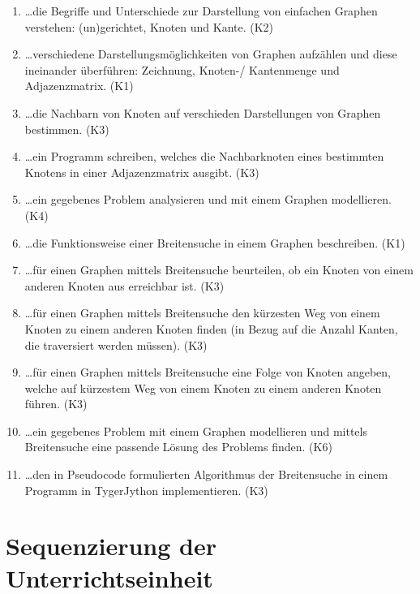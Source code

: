 \begin{enumerate}
\item \dots die Begriffe und Unterschiede zur Darstellung von einfachen Graphen verstehen: (un)gerichtet, Knoten und Kante. (K2)

\item \dots verschiedene Darstellungsmöglichkeiten von Graphen aufzählen und diese ineinander überführen: Zeichnung, Knoten-/ Kantenmenge und Adjazenzmatrix. (K1)

\item \dots die Nachbarn von Knoten auf verschieden Darstellungen von Graphen bestimmen. (K3)

\item \dots ein Programm schreiben, welches die Nachbarknoten eines bestimmten Knotens in einer Adjazenzmatrix ausgibt. (K3)

\item\dots ein gegebenes Problem analysieren und mit einem Graphen modellieren. (K4)
 
\item \dots die Funktionsweise einer Breitensuche in einem Graphen beschreiben. (K1)

\item\dots f\"ur einen Graphen mittels Breitensuche beurteilen, ob ein Knoten von einem anderen Knoten aus erreichbar ist. (K3)

\item\dots f\"ur einen Graphen mittels Breitensuche den k\"urzesten Weg von einem Knoten zu einem anderen Knoten finden (in Bezug auf die Anzahl Kanten, die traversiert werden m\"ussen). (K3)

\item\dots f\"ur einen Graphen mittels Breitensuche eine Folge von Knoten angeben, welche auf k\"urzestem Weg von einem Knoten zu einem anderen Knoten f\"uhren. (K3)

\item \dots ein gegebenes Problem mit einem Graphen modellieren und mittels Breitensuche eine passende Lösung des Problems finden. (K6)

\item \dots den in Pseudocode formulierten Algorithmus der Breitensuche in einem Programm in TygerJython implementieren. (K3)


\end{enumerate}

\section{Sequenzierung der Unterrichtseinheit}\label{lpu:inhalt}

